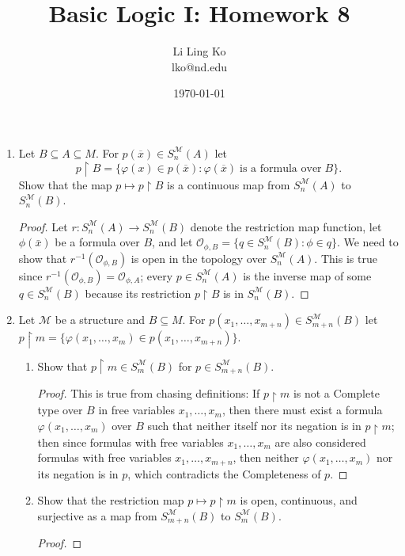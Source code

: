 \documentclass{article}
\begin{document}
\title{Basic Logic I: Homework 8}
\author{Li Ling Ko\\ lko@nd.edu}
\date{\today}
\maketitle

\begin{enumerate}[label={\bf Q\arabic*:}]
  \item Let $B\subseteq A\subseteq M$. For $p(\overline{x})\in
    S^{\mathcal{M}}_n(A)$ let \[p\restriction B=\{\varphi(x)\in
    p(\overline{x}):\varphi(\overline{x})\; \text{is a formula over}\;
    B\}.\] Show that the map $p\mapsto p\restriction B$ is a continuous
    map from $S^{\mathcal{M}}_n(A)$ to $S^{\mathcal{M}}_n(B)$.

    \begin{proof}
      Let $r:S^{\mathcal{M}}_n(A)\rightarrow S^{\mathcal{M}}_n(B)$ denote
      the restriction map function, let $\phi(\bar{x})$ be a formula over
      $B$, and let $\mathcal{O}_{\phi,B}=\{q\in
      S^{\mathcal{M}}_n(B):\phi\in q\}$. We need to show that
      $r^{-1}(\mathcal{O}_{\phi,B})$ is open in the topology over
      $S^{\mathcal{M}}_n(A)$. This is true since
      $r^{-1}(\mathcal{O}_{\phi,B})=\mathcal{O}_{\phi,A}$; every
      $p\in S^{\mathcal{M}}_n(A)$ is the inverse map of some $q\in
      S^{\mathcal{M}}_n(B)$ because its restriction $p\restriction B$ is in
      $S^{\mathcal{M}}_n(B)$.
    \end{proof}

  \item Let $\mathcal{M}$ be a structure and $B\subseteq M$. For
    $p(x_1,\ldots,x_{m+n})\in S^{\mathcal{M}}_{m+n}(B)$ let $p\restriction
    m=\{\varphi(x_1,\ldots,x_m)\in p(x_1,\ldots,x_{m+n})\}$.
    \begin{enumerate}
      \item Show that $p\restriction m\in S^{\mathcal{M}}_m(B)$ for $p\in
        S^{\mathcal{M}}_{m+n}(B)$.
        \begin{proof}
          This is true from chasing definitions: If $p\restriction m$ is
          not a Complete type over $B$ in free variables $x_1,\ldots,x_m$,
          then there must exist a formula $\varphi(x_1,\ldots,x_m)$ over
          $B$ such that neither itself nor its negation is in
          $p\restriction m$; then since formulas with free variables
          $x_1,\ldots,x_m$ are also considered formulas with free variables
          $x_1,\ldots,x_{m+n}$, then neither $\varphi(x_1,\ldots,x_m)$ nor
          its negation is in $p$, which contradicts the Completeness of
          $p$.
        \end{proof}

      \item Show that the restriction map $p\mapsto p\restriction m$ is
        open, continuous, and surjective as a map from
        $S^{\mathcal{M}}_{m+n}(B)$ to $S^{\mathcal{M}}_{m}(B)$.
        \begin{proof}
        \end{proof}
    \end{enumerate}
\end{enumerate}
\end{document}
